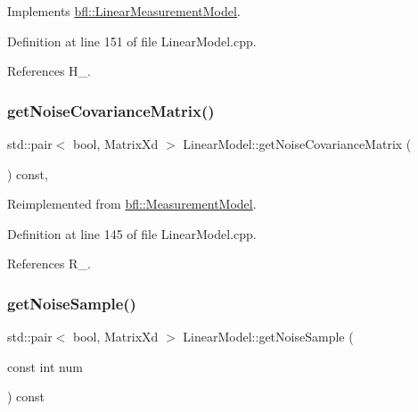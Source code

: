 Implements \mbox{\hyperlink{classbfl_1_1LinearMeasurementModel_a719734ef024a766f03b86e51dc849953}{bfl\+::\+Linear\+Measurement\+Model}}.



Definition at line 151 of file Linear\+Model.\+cpp.



References H\+\_\+.

\mbox{\label{classbfl_1_1LinearModel_a9adc7aabd58e79ce71c283866ddbf655}} 
\subsubsection{\texorpdfstring{get\+Noise\+Covariance\+Matrix()}{getNoiseCovarianceMatrix()}}
{\footnotesize\ttfamily std\+::pair$<$ bool, Matrix\+Xd $>$ Linear\+Model\+::get\+Noise\+Covariance\+Matrix (\begin{DoxyParamCaption}{ }\end{DoxyParamCaption}) const\hspace{0.3cm}{\ttfamily [override]}, {\ttfamily [virtual]}}



Reimplemented from \mbox{\hyperlink{classbfl_1_1MeasurementModel_af25f42076b69e0c6cab47d36d796536f}{bfl\+::\+Measurement\+Model}}.



Definition at line 145 of file Linear\+Model.\+cpp.



References R\+\_\+.

\mbox{\label{classbfl_1_1LinearModel_af248dfa32cd9145d87e84ddade6316ad}} 
\subsubsection{\texorpdfstring{get\+Noise\+Sample()}{getNoiseSample()}}
{\footnotesize\ttfamily std\+::pair$<$ bool, Matrix\+Xd $>$ Linear\+Model\+::get\+Noise\+Sample (\begin{DoxyParamCaption}\item[{const int}]{num }\end{DoxyParamCaption}) const\hspace{0.3cm}{\ttfamily [protected]}}



